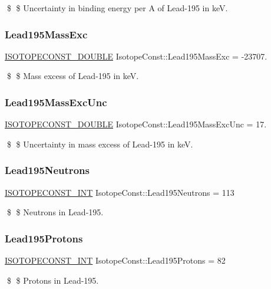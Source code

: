 \$ \$ Uncertainty in binding energy per A of Lead-\/195 in keV. \mbox{\label{group___isotope_const-_lead-_pb195_gaa5424c8efa7c5a60297fbab978f2734a}} 
\subsubsection{\texorpdfstring{Lead195\+Mass\+Exc}{Lead195MassExc}}
{\footnotesize\ttfamily \mbox{\hyperlink{group___isotope_const-_macros_ga8f45a7272ce02c0b4c65c44636ed719a}{I\+S\+O\+T\+O\+P\+E\+C\+O\+N\+S\+T\+\_\+\+D\+O\+U\+B\+LE}} Isotope\+Const\+::\+Lead195\+Mass\+Exc = -\/23707.}

\$ \$ Mass excess of Lead-\/195 in keV. \mbox{\label{group___isotope_const-_lead-_pb195_ga60bfe753e52a847766220f37cc70f4f4}} 
\subsubsection{\texorpdfstring{Lead195\+Mass\+Exc\+Unc}{Lead195MassExcUnc}}
{\footnotesize\ttfamily \mbox{\hyperlink{group___isotope_const-_macros_ga8f45a7272ce02c0b4c65c44636ed719a}{I\+S\+O\+T\+O\+P\+E\+C\+O\+N\+S\+T\+\_\+\+D\+O\+U\+B\+LE}} Isotope\+Const\+::\+Lead195\+Mass\+Exc\+Unc = 17.}

\$ \$ Uncertainty in mass excess of Lead-\/195 in keV. \mbox{\label{group___isotope_const-_lead-_pb195_ga416158c5465c32512bf867e02c05ca1d}} 
\subsubsection{\texorpdfstring{Lead195\+Neutrons}{Lead195Neutrons}}
{\footnotesize\ttfamily \mbox{\hyperlink{group___isotope_const-_macros_ga5f18360b3e99483a35c32d789e62621c}{I\+S\+O\+T\+O\+P\+E\+C\+O\+N\+S\+T\+\_\+\+I\+NT}} Isotope\+Const\+::\+Lead195\+Neutrons = 113}

\$ \$ Neutrons in Lead-\/195. \mbox{\label{group___isotope_const-_lead-_pb195_ga0b19076829b407ac0d58b04eed3eb246}} 
\subsubsection{\texorpdfstring{Lead195\+Protons}{Lead195Protons}}
{\footnotesize\ttfamily \mbox{\hyperlink{group___isotope_const-_macros_ga5f18360b3e99483a35c32d789e62621c}{I\+S\+O\+T\+O\+P\+E\+C\+O\+N\+S\+T\+\_\+\+I\+NT}} Isotope\+Const\+::\+Lead195\+Protons = 82}

\$ \$ Protons in Lead-\/195. 
